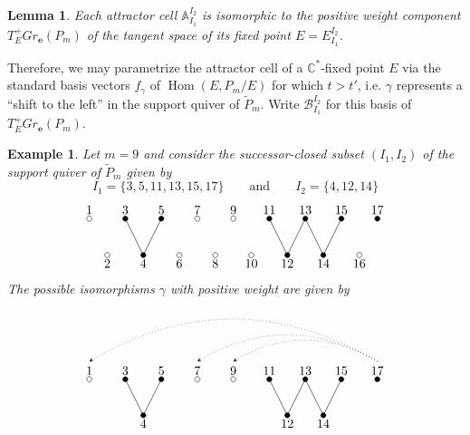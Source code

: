 \documentclass{amsart}
\newtheorem{example}[theorem]{Example}
\newtheorem{lemma}[theorem]{Lemma}
\numberwithin{equation}{section}
\renewcommand{\AA}{\mathbb{A}}
\newcommand{\CC}{\mathbb{C}}
\newcommand{\bfe}{\mathbf{e}}
\newcommand{\cB}{\mathcal{B}}
\newcommand{\Hom}{\operatorname{Hom}}
\begin{document}
    \begin{lemma}
      Each attractor cell $\AA_{I_1}^{I_2}$ is isomorphic to the positive weight component $T^+_E Gr_\bfe(P_m)$ of the tangent space of its fixed point $E=E_{I_1}^{I_2}$.
    \end{lemma}

    Therefore, we may parametrize the attractor cell of a $\CC^*$-fixed point $E$ via the standard basis vectors $f_\gamma$ of $\Hom(E,P_m/E)$ for which $t>t'$, i.e. $\gamma$ represents a ``shift to the left'' in the support quiver of $\tilde P_m$.
    Write $\cB_{I_1}^{I_2}$ for this basis of $T^+_E Gr_\bfe(P_m)$.

    \begin{example}
      Let $m=9$ and consider the successor-closed subset $(I_1,I_2)$ of the support quiver of $\tilde P_m$ given by
      \[I_1=\{3,5,11,13,15,17\}\qquad\text{and}\qquad I_2=\{4,12,14\}\]
      \[
        \begin{tikzpicture}
          \foreach \i in {3,5,11,13,15,17}{
            \draw[fill=black] (0.5*\i,1) circle (2pt);
            \node[above] at (0.5*\i,1) {\i};}
          \foreach \i in {1,7,9}{
            \draw[fill=white] (0.5*\i,1) circle (2pt);
            \node[above] at (0.5*\i,1) {\i};}
          \foreach \i in {4,12,14}{
            \draw[fill=black] (0.5*\i,0) circle (2pt);
            \draw (0.5*\i,0) -- (0.5*\i-0.5,1);
            \draw (0.5*\i,0) -- (0.5*\i+0.5,1);
            \node[below] at (0.5*\i,0) {\i};}
          \foreach \i in {2,6,8,10,16}{
            \draw[fill=white] (0.5*\i,0) circle (2pt);
            \node[below] at (0.5*\i,0) {\i};}
        \end{tikzpicture}
      \]
      The possible isomorphisms $\gamma$ with positive weight are given by
      \[
        \begin{tikzpicture}
          \draw[dotted,-stealth] (8.5,1.5) to[out=150,in=30] (0.5,1.5);
          \draw[dotted,-stealth] (8.5,1.5) to[out=150,in=30] (3.5,1.5);
          \draw[dotted,-stealth] (8.5,1.5) to[out=150,in=30] (4.5,1.5);
          \foreach \i in {3,5,11,13,15,17}{
            \draw[fill=black] (0.5*\i,1) circle (2pt);
            \node[above] at (0.5*\i,1) {\i};}
          \foreach \i in {1,7,9}{
            \draw[fill=white] (0.5*\i,1) circle (2pt);
            \node[above] at (0.5*\i,1) {\i};}
          \foreach \i in {4,12,14}{
            \draw[fill=black] (0.5*\i,0) circle (2pt);
            \draw (0.5*\i,0) -- (0.5*\i-0.5,1);
            \draw (0.5*\i,0) -- (0.5*\i+0.5,1);
            \node[below] at (0.5*\i,0) {\i};}

\end{tikzpicture}\]
\end{example}
\end{document}
